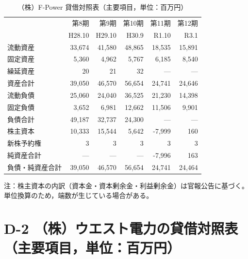 \begin{table}[H]
\centering
\caption{（株）F-Power 貸借対照表（主要項目，単位：百万円）}
\begin{tabular}{lrrrrr}
\toprule
 & 第8期 & 第9期 & 第10期 & 第11期 & 第12期 \\
 & H28.10 & H29.10 & H30.9 & R1.10 & R3.1 \\
\midrule
流動資産       & 33{,}674 & 41{,}580 & 48{,}865 & 18{,}535 & 15{,}891 \\
固定資産       & 5{,}360  & 4{,}962  & 5{,}767  & 6{,}185  & 8{,}540 \\
繰延資産       & 20       & 21       & 32       & —       & — \\
\midrule
資産合計       & 39{,}050 & 46{,}570 & 56{,}654 & 24{,}741 & 24{,}646 \\
\midrule
流動負債       & 25{,}060 & 24{,}040 & 36{,}525 & 21{,}230 & 14{,}398 \\
固定負債       & 3{,}652  & 6{,}981  & 12{,}662 & 11{,}506 & 9{,}901 \\
負債合計       & 49{,}187 & 32{,}737 & 24{,}300 & —       & — \\
\midrule
株主資本       & 10{,}333 & 15{,}544 & 5{,}642  & -7{,}999 & 160 \\
新株予約権     & 3        & 3        & 3        & 3        & 3 \\
純資産合計     & —        & —        & —        & -7{,}996 & 163 \\
\midrule
負債・純資産合計 & 39{,}050 & 46{,}570 & 56{,}654 & 24{,}741 & 24{,}464 \\
\bottomrule
\end{tabular}
\end{table}

\begin{flushleft}
\footnotesize
注：株主資本の内訳（資本金・資本剰余金・利益剰余金）は官報公告に基づく。
単位換算のため，端数が生じている場合がある。
\end{flushleft}

\section*{D-2 （株）ウエスト電力の貸借対照表（主要項目，単位：百万円）}

